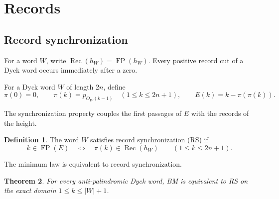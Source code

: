 \documentclass[11pt]{article}
\newtheorem{theorem}{Theorem}[section]
\theoremstyle{definition}
\newtheorem{definition}[theorem]{Definition}
\theoremstyle{remark}
\DeclareMathOperator{\Rec}{Rec}
\DeclareMathOperator{\FP}{FP}
\begin{document}
\section{Records}
\label{sec:records}

\subsection{Record synchronization}

For a word \(W\), write \(\Rec(h_W)=\FP(h_W)\).  Every positive record cut of
a Dyck word occurs immediately after a zero.

For a Dyck word \(W\) of length \(2n\), define
\begin{equation}
\label{eq:pi-E}
 \pi(0)=0,
 \qquad \pi(k)=p_{O_W(k-1)}\quad(1\leq k\leq2n+1),
 \qquad E(k)=k-\pi(\pi(k)).
\end{equation}

The synchronization property couples the first passages of $E$ with the records of the height.
\begin{definition}
The word \(W\) satisfies record synchronization (RS) if
\begin{equation*}
 k\in\FP(E)
 \quad\Longleftrightarrow\quad
 \pi(k)\in\Rec(h_W)
 \qquad(1\leq k\leq2n+1).
\end{equation*}
\end{definition}

The minimum law is equivalent to record synchronization.
\begin{theorem}
\label{thm:BM-RS}
For every anti-palindromic Dyck word, BM is equivalent to RS on the exact
domain \(1\leq k\leq|W|+1\).
\end{theorem}
\end{document}
